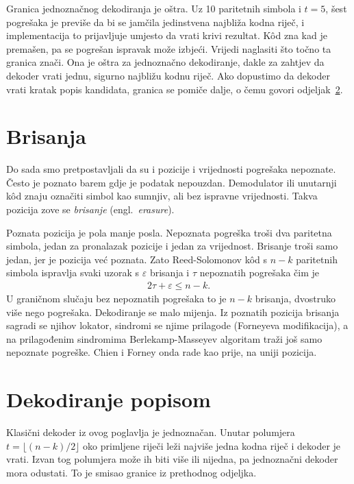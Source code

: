 \documentclass{mathos}
\begin{document}
Granica jednoznačnog dekodiranja je oštra. Uz 10 paritetnih simbola i $t = 5$, šest pogrešaka je previše da bi se jamčila jedinstvena najbliža kodna riječ, i implementacija to prijavljuje umjesto da vrati krivi rezultat. Kôd zna kad je premašen, pa se pogrešan ispravak može izbjeći. Vrijedi naglasiti što točno ta granica znači. Ona je oštra za jednoznačno dekodiranje, dakle za zahtjev da dekoder vrati jednu, sigurno najbližu kodnu riječ. Ako dopustimo da dekoder vrati kratak popis kandidata, granica se pomiče dalje, o čemu govori odjeljak~\ref{list}.

\section{Brisanja}\label{brisanja}

Do sada smo pretpostavljali da su i pozicije i vrijednosti pogrešaka nepoznate. Često je poznato barem gdje je podatak nepouzdan. Demodulator ili unutarnji kôd znaju označiti simbol kao sumnjiv, ali bez ispravne vrijednosti. Takva pozicija zove se \emph{brisanje} (engl.\ \emph{erasure}).

Poznata pozicija je pola manje posla. Nepoznata pogreška troši dva paritetna simbola, jedan za pronalazak pozicije i jedan za vrijednost. Brisanje troši samo jedan, jer je pozicija već poznata. Zato Reed-Solomonov kôd s $n-k$ paritetnih simbola ispravlja svaki uzorak s $\varepsilon$ brisanja i $\tau$ nepoznatih pogrešaka čim je
\begin{align}\label{eq:erasure}
    2\tau + \varepsilon \le n - k.
\end{align}
U graničnom slučaju bez nepoznatih pogrešaka to je $n-k$ brisanja, dvostruko više nego pogrešaka. Dekodiranje se malo mijenja. Iz poznatih pozicija brisanja sagradi se njihov lokator, sindromi se njime prilagode (Forneyeva modifikacija), a na prilagođenim sindromima Berlekamp-Masseyev algoritam traži još samo nepoznate pogreške. Chien i Forney onda rade kao prije, na uniji pozicija.

\section{Dekodiranje popisom}\label{list}

Klasični dekoder iz ovog poglavlja je jednoznačan. Unutar polumjera $t = \lfloor (n-k)/2 \rfloor$ oko primljene riječi leži najviše jedna kodna riječ i dekoder je vrati. Izvan tog polumjera može ih biti više ili nijedna, pa jednoznačni dekoder mora odustati. To je smisao granice iz prethodnog odjeljka.
\end{document}
